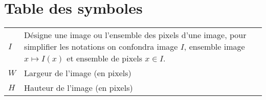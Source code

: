 
\clearpage
{}
{}
\chapter*{Table des symboles}

{
\centering
\renewcommand{\arraystretch}{2.0}
\begin{tabularx}{\textwidth}{lX}
\textbf{$I$} & Désigne une image ou l'ensemble des pixels d'une image, pour
simplifier les notations on confondra image $I$, ensemble image $x \mapsto
I(x)$ et ensemble de pixels $x \in I$. \\
\textbf{$W$} & Largeur de l'image (en pixels) \\
\textbf{$H$} & Hauteur de l'image (en pixels) 
\end{tabularx}
}